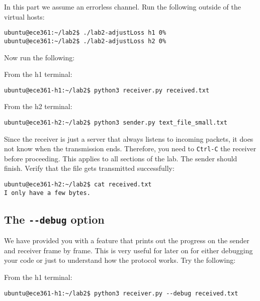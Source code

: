 \documentclass[11pt]{article}
\begin{document}
In this part we assume an errorless channel. Run the following outside of the virtual hosts:
\begin{lstlisting}[style=ece361shell, caption={Setting packet loss to 0\% in both directions.}]
ubuntu@ece361:~/lab2$ ./lab2-adjustLoss h1 0%
ubuntu@ece361:~/lab2$ ./lab2-adjustLoss h2 0%
\end{lstlisting}


Now run the following:

From the h1 terminal:
\begin{lstlisting}[style=ece361-shell-base, caption={}]
ubuntu@ece361-h1:~/lab2$ python3 receiver.py received.txt
\end{lstlisting}

From the h2 terminal:
\begin{lstlisting}[style=ece361-shell-base, caption={}]
ubuntu@ece361-h2:~/lab2$ python3 sender.py text_file_small.txt
\end{lstlisting}

Since the receiver is just a server that always listens to incoming packets, it does not know when the transmission ends. Therefore, you need to \texttt{Ctrl-C} the receiver before proceeding. This applies to all sections of the lab.
The sender should finish. Verify that the file gets transmitted successfully:
\begin{lstlisting}[style=ece361-shell-base, caption={}]
ubuntu@ece361-h2:~/lab2$ cat received.txt
I only have a few bytes.
\end{lstlisting}


\subsection {The \texttt{-{}-debug} option}
We have provided you with a feature that prints out the progress on the sender and receiver frame by frame. This is very useful for later on for either debugging your code or just to understand how the protocol works. Try the following:

From the h1 terminal:
\begin{lstlisting}[style=ece361-shell-base, caption={}]
ubuntu@ece361-h1:~/lab2$ python3 receiver.py --debug received.txt
\end{lstlisting}
\end{document}
